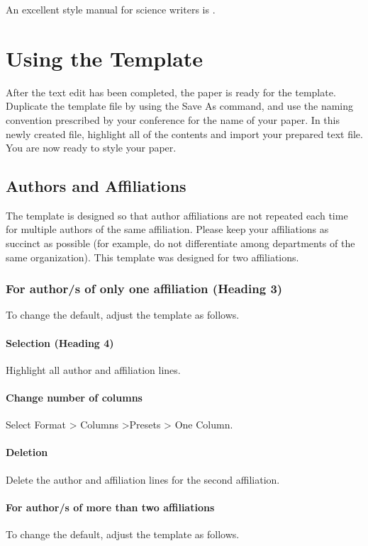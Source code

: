 \documentclass[conference]{IEEEtran}
\begin{document}
An excellent style manual for science writers is \cite{b7}.

\section{Using the Template} 
After the text edit has been completed, the paper is ready for the template. Duplicate the template file by using the Save As command, and use the naming convention prescribed by your conference for the name of your paper. In this newly created file, highlight all of the contents and import your prepared text file. You are now ready to style your paper. 

\subsection{Authors and Affiliations} 
The template is designed so that author affiliations are not repeated each time for multiple authors of the same affiliation. Please keep your affiliations as succinct as possible (for example, do not differentiate among departments of the same organization). This template was designed for two affiliations.

\subsubsection{For author/s of only one affiliation (Heading 3)} To change the default, adjust the template as follows.

\paragraph{Selection (Heading 4)} 
Highlight all author and affiliation lines.

\paragraph{Change number of columns} 
Select Format > Columns >Presets > One Column. 

\paragraph{Deletion} 
Delete the author and affiliation lines for the second affiliation.

\paragraph{For author/s of more than two affiliations} 
To change the default, adjust the template as follows.
\end{document}
